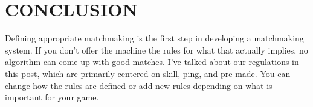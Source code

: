 \documentclass[12pt]{report}
\begin{document}

% 


\centering
\section{CONCLUSION }
\justifying
\setlength{\parindent}{4em}
\setlength{\parskip}{0.5em}
\renewcommand{\baselinestretch}{1.5}
\normalsize

\hspace{1.7cm}
Defining appropriate matchmaking is the first step in developing a matchmaking system.
If you don't offer the machine the rules for what that actually implies,
no algorithm can come up with good matches.
I've talked about our regulations in this post,
which are primarily centered on skill, ping, and pre-made.
You can change how the rules are defined or add new rules depending on what is important for your game. 
\\
\vspace{15cm}
\end{document}
